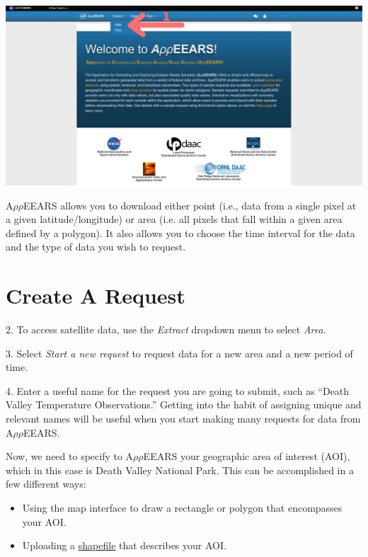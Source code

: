\documentclass[oneside,a4paper,11pt,explicit]{book}
\begin{document}
\vspace{.5em}

\centerline{\includegraphics[width=\textwidth]{AppEEARShome.png}}

A$\rho\rho$EEARS allows you to download either point (i.e., data from a single pixel at a given latitude/longitude) or area (i.e. all pixels that fall within a given area defined by a polygon). It also allows you to choose the time interval for the data and the type of data you wish to request.  

\section{Create A Request}
2. To access satellite data, use the \textit{Extract} dropdown menu to select \textit{Area}. 

3. Select \textit{Start a new request} to request data for a new area and a new period of time.

4. Enter a useful name for the request you are going to submit, such as ``Death Valley Temperature Observations.'' Getting into the habit of assigning unique and relevant names will be useful when you start making many requests for data from A$\rho\rho$EEARS.

\vspace{1em}

Now, we need to specify to A$\rho\rho$EEARS your geographic area of interest (AOI), which in this case is Death Valley National Park. This can be accomplished in a few different ways:

\begin{itemize}
	\item Using the map interface to draw a rectangle or polygon that encompasses your AOI.
	\item Uploading a \href{https://en.wikipedia.org/wiki/Shapefile}{shapefile} that describes your AOI.	
\end{itemize}
\end{document}
